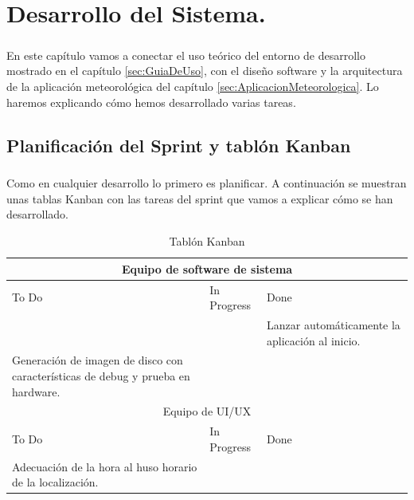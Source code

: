 \chapter{Desarrollo del Sistema.}\label{sec:Desarrollo}

\paragraph{}En este capítulo vamos a conectar el uso teórico del entorno de desarrollo
mostrado en el capítulo \ref{sec:GuiaDeUso}, con el diseño software y la arquitectura de
la aplicación meteorológica del capítulo \ref{sec:AplicacionMeteorologica}. Lo haremos
explicando cómo hemos desarrollado varias tareas.

\section{Planificación del Sprint y tablón Kanban}

\paragraph{}Como en cualquier desarrollo lo primero es planificar. A continuación se
muestran unas tablas Kanban con las tareas del sprint que vamos a explicar cómo se
han desarrollado.

\begin{table}[H]
\begin{center}
\begin{tabular}{| p{} | p{} | p{} |}
    \hline
    \multicolumn{3}{|c|}{Equipo de software de sistema} \\
    \hline
    To Do & In Progress & Done \\
    \hline
    &  & Lanzar automáticamente la aplicación al inicio. \\
    Generación de imagen de disco con características de debug y prueba en hardware. & & \\
    \hline
    \hline
    \multicolumn{3}{|c|}{Equipo de UI/UX} \\
    \hline
    To Do & In Progress & Done \\
    \hline
    Adecuación de la hora al huso horario de la localización. &  & \\
    \hline
\end{tabular}
\caption{Tablón Kanban}
\label{tab:Kanban}
\end{center}
\end{table}


